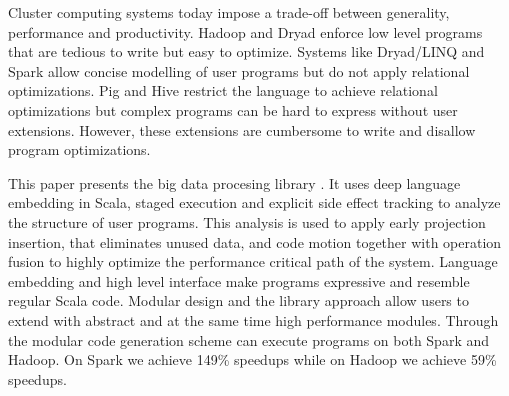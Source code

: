 Cluster computing systems today impose a trade-off between generality, performance and productivity. Hadoop and Dryad enforce low level programs that are tedious to write but easy to optimize. Systems like Dryad/LINQ and Spark allow concise modelling of user programs but do not apply relational optimizations. Pig and Hive restrict the language to achieve relational optimizations but complex programs can be hard to express without user extensions. However, these extensions are cumbersome to write and disallow program optimizations.

This paper presents the big data procesing library \tool. It uses deep language embedding in Scala, staged execution and explicit side effect tracking to analyze the structure of user programs. This analysis is used to apply early projection insertion, that eliminates unused data, and code motion together with operation fusion to highly optimize the performance critical path of the system. Language embedding and high level interface make \tool programs expressive and resemble regular Scala code. Modular design and the library approach allow users to extend \tool with abstract and at the same time high performance modules. Through the modular code generation scheme \tool can execute programs on both Spark and Hadoop. On Spark we achieve 149\% speedups while on Hadoop we achieve 59\% speedups. 